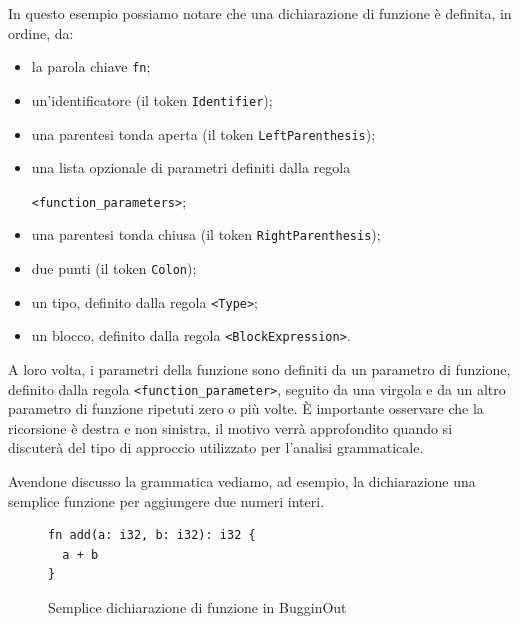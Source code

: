 In questo esempio possiamo notare che una dichiarazione di funzione \`e definita, in ordine, da:
\begin{itemize}
	\item la parola chiave \texttt{fn};
	\item un'identificatore (il token \texttt{Identifier});
	\item una parentesi tonda aperta (il token \texttt{LeftParenthesis});
	\item una lista opzionale di parametri definiti dalla regola \raggedright\texttt{<function\_parameters>};
	\item una parentesi tonda chiusa (il token \texttt{RightParenthesis});
	\item due punti (il token \texttt{Colon});
	\item un tipo, definito dalla regola \texttt{<Type>};
	\item un blocco, definito dalla regola \texttt{<BlockExpression>}.
\end{itemize}

A loro volta, i parametri della funzione sono definiti da un parametro di funzione, definito dalla regola \texttt{<function\_parameter>}, seguito da una virgola e da un altro parametro di funzione ripetuti zero o pi\`u volte. \`E importante osservare che la ricorsione \`e destra e non sinistra, il motivo verr\`a approfondito quando si discuter\`a del tipo di approccio utilizzato per l'analisi grammaticale.

Avendone discusso la grammatica vediamo, ad esempio, la dichiarazione una semplice funzione per aggiungere due numeri interi.
\begin{figure}[H]
	\centering
	\begin{verbatim}
fn add(a: i32, b: i32): i32 {
  a + b
}
	\end{verbatim}
	\label{fig:bugginout-example-function-declaration}
	\caption{Semplice dichiarazione di funzione in BugginOut}
\end{figure}


